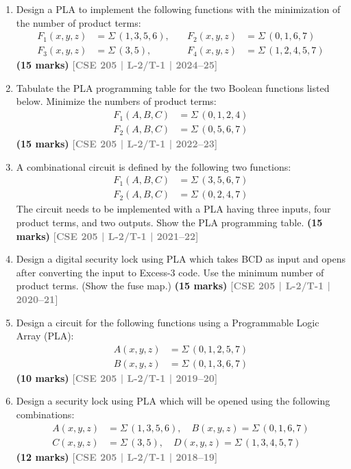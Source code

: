 \documentclass[12pt]{article}
\newcommand{\yr}[1]{\hfill\textcolor{gray}{\small\textbf{[#1]}}}
\newcommand{\mk}[1]{\textcolor{orange!70!black}{\small\textbf{(#1 marks)}}}
\begin{document}
\begin{enumerate}

\item Design a PLA to implement the following functions with the minimization of the number of product terms:
\begin{align*}
  F_1(x, y, z) &= \Sigma\,(1,3,5,6),\quad & F_2(x, y, z) &= \Sigma\,(0,1,6,7) \\
  F_3(x, y, z) &= \Sigma\,(3,5),\quad & F_4(x, y, z) &= \Sigma\,(1,2,4,5,7)
\end{align*}
\mk{15} \yr{CSE 205 | L-2/T-1 | 2024--25}

\item Tabulate the PLA programming table for the two Boolean functions listed below. Minimize the numbers of product terms:
\begin{align*}
  F_1(A, B, C) &= \Sigma\,(0, 1, 2, 4) \\
  F_2(A, B, C) &= \Sigma\,(0, 5, 6, 7)
\end{align*}
\mk{15} \yr{CSE 205 | L-2/T-1 | 2022--23}

\item A combinational circuit is defined by the following two functions:
\begin{align*}
  F_1(A, B, C) &= \Sigma\,(3, 5, 6, 7) \\
  F_2(A, B, C) &= \Sigma\,(0, 2, 4, 7)
\end{align*}
The circuit needs to be implemented with a PLA having three inputs, four product terms, and two outputs. Show the PLA programming table.
\mk{15} \yr{CSE 205 | L-2/T-1 | 2021--22}

\item Design a digital security lock using PLA which takes BCD as input and opens after converting the input to Excess-3 code. Use the minimum number of product terms. (Show the fuse map.)
\mk{15} \yr{CSE 205 | L-2/T-1 | 2020--21}

\item Design a circuit for the following functions using a Programmable Logic Array (PLA):
\begin{align*}
  A(x,y,z) &= \Sigma\,(0,1,2,5,7) \\
  B(x,y,z) &= \Sigma\,(0,1,3,6,7)
\end{align*}
\mk{10} \yr{CSE 205 | L-2/T-1 | 2019--20}

\item Design a security lock using PLA which will be opened using the following combinations:
\begin{align*}
  A(x,y,z) &= \Sigma\,(1,3,5,6),\quad B(x,y,z) = \Sigma\,(0,1,6,7) \\
  C(x,y,z) &= \Sigma\,(3,5),\quad D(x,y,z) = \Sigma\,(1,3,4,5,7)
\end{align*}
\mk{12} \yr{CSE 205 | L-2/T-1 | 2018--19}


\end{enumerate}
\end{document}
